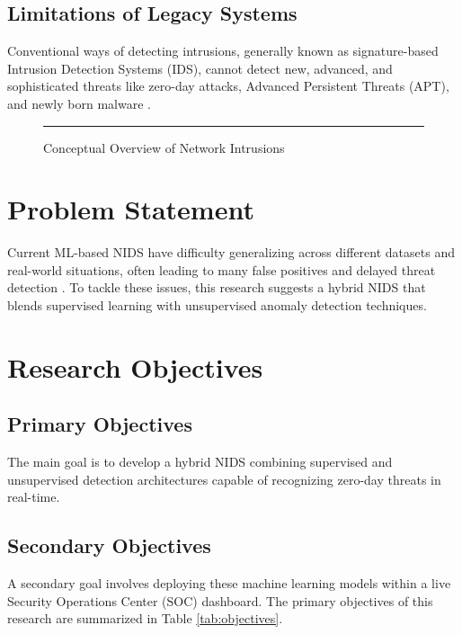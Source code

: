 \documentclass[12pt, a4paper]{report}
\begin{document}
\subsection{Limitations of Legacy Systems}
Conventional ways of detecting intrusions, generally known as signature-based Intrusion Detection Systems (IDS), cannot detect new, advanced, and sophisticated threats like zero-day attacks, Advanced Persistent Threats (APT), and newly born malware \cite{ref2}. 

\begin{figure}[htbp]
    \centering
    \rule{0.8\textwidth}{5cm}
    \caption{Conceptual Overview of Network Intrusions}
    \label{fig:intro_network}
\end{figure}

\section{Problem Statement}
Current ML-based NIDS have difficulty generalizing across different datasets and real-world situations, often leading to many false positives and delayed threat detection \cite{ref3}. To tackle these issues, this research suggests a hybrid NIDS that blends supervised learning with unsupervised anomaly detection techniques.

\section{Research Objectives}
\subsection{Primary Objectives}
The main goal is to develop a hybrid NIDS combining supervised and unsupervised detection architectures capable of recognizing zero-day threats in real-time.
\subsection{Secondary Objectives}
A secondary goal involves deploying these machine learning models within a live Security Operations Center (SOC) dashboard. The primary objectives of this research are summarized in Table \ref{tab:objectives}.
\end{document}
